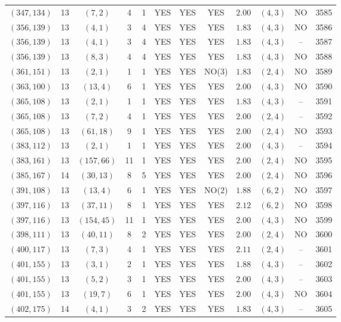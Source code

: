 \begin{longtable}{|c|c|c|c|c|c|c|c|c|c|c|c|}
$(347,134)$ & 13 & $(7,2)$ & 4 & 1 & YES & YES & YES & $2.00$ & $(4,3)$ & NO & 3585\\
$(356,139)$ & 13 & $(4,1)$ & 3 & 4 & YES & YES & YES & $1.83$ & $(4,3)$ & NO & 3586\\
$(356,139)$ & 13 & $(4,1)$ & 3 & 4 & YES & YES & YES & $1.83$ & $(4,3)$ & -- & 3587\\
$(356,139)$ & 13 & $(8,3)$ & 4 & 4 & YES & YES & YES & $1.83$ & $(4,3)$ & NO & 3588\\
$(361,151)$ & 13 & $(2,1)$ & 1 & 1 & YES & YES & NO(3) & $1.83$ & $(2,4)$ & NO & 3589\\
$(363,100)$ & 13 & $(13,4)$ & 6 & 1 & YES & YES & YES & $2.00$ & $(4,3)$ & NO & 3590\\
$(365,108)$ & 13 & $(2,1)$ & 1 & 1 & YES & YES & YES & $1.83$ & $(4,3)$ & -- & 3591\\
$(365,108)$ & 13 & $(7,2)$ & 4 & 1 & YES & YES & YES & $2.00$ & $(2,4)$ & -- & 3592\\
$(365,108)$ & 13 & $(61,18)$ & 9 & 1 & YES & YES & YES & $2.00$ & $(2,4)$ & NO & 3593\\
$(383,112)$ & 13 & $(2,1)$ & 1 & 1 & YES & YES & YES & $2.00$ & $(4,3)$ & -- & 3594\\
$(383,161)$ & 13 & $(157,66)$ & 11 & 1 & YES & YES & YES & $2.00$ & $(2,4)$ & NO & 3595\\
$(385,167)$ & 14 & $(30,13)$ & 8 & 5 & YES & YES & YES & $2.00$ & $(2,4)$ & NO & 3596\\
$(391,108)$ & 13 & $(13,4)$ & 6 & 1 & YES & YES & NO(2) & $1.88$ & $(6,2)$ & NO & 3597\\
$(397,116)$ & 13 & $(37,11)$ & 8 & 1 & YES & YES & YES & $2.12$ & $(6,2)$ & NO & 3598\\
$(397,116)$ & 13 & $(154,45)$ & 11 & 1 & YES & YES & YES & $2.00$ & $(4,3)$ & NO & 3599\\
$(398,111)$ & 13 & $(40,11)$ & 8 & 2 & YES & YES & YES & $2.00$ & $(2,4)$ & NO & 3600\\
$(400,117)$ & 13 & $(7,3)$ & 4 & 1 & YES & YES & YES & $2.11$ & $(2,4)$ & -- & 3601\\
$(401,155)$ & 13 & $(3,1)$ & 2 & 1 & YES & YES & YES & $1.88$ & $(4,3)$ & -- & 3602\\
$(401,155)$ & 13 & $(5,2)$ & 3 & 1 & YES & YES & YES & $2.00$ & $(4,3)$ & -- & 3603\\
$(401,155)$ & 13 & $(19,7)$ & 6 & 1 & YES & YES & YES & $2.00$ & $(4,3)$ & NO & 3604\\
$(402,175)$ & 14 & $(4,1)$ & 3 & 2 & YES & YES & YES & $1.83$ & $(4,3)$ & -- & 3605\\

\end{longtable}
